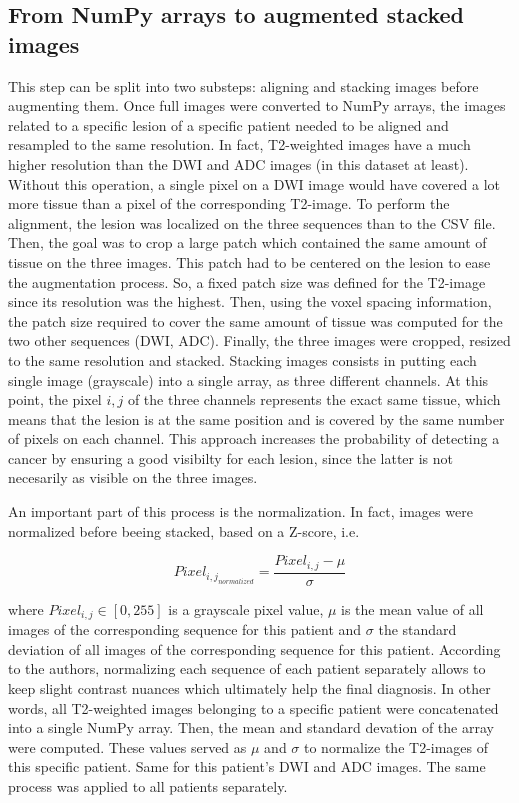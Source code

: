 \subsection{From NumPy arrays to augmented stacked images}
\label{sec:numpyToAugmentedStacked}
This step can be split into two substeps: aligning and stacking images before augmenting them. Once full images were converted to NumPy arrays, the images related to a specific lesion of a specific patient needed to be aligned and resampled to the same resolution. In fact, T2-weighted images have a much higher resolution than the DWI and ADC images (in this dataset at least). Without this operation, a single pixel on a DWI image would have covered a lot more tissue than a pixel of the corresponding T2-image. To perform the alignment, the lesion was localized on the three sequences than to the CSV file. Then, the goal was to crop a large patch which contained the same amount of tissue on the three images. This patch had to be centered on the lesion to ease the augmentation process. So, a fixed patch size was defined for the T2-image since its resolution was the highest. Then, using the voxel spacing information, the patch size required to cover the same amount of tissue was computed for the two other sequences (DWI, ADC). Finally, the three images were cropped, resized to the same resolution and stacked. Stacking images consists in putting each single image (grayscale) into a single array, as three different channels. At this point, the pixel $i,j$ of the three channels represents the exact same tissue, which means that the lesion is at the same position and is covered by the same number of pixels on each channel. This approach increases the probability of detecting a cancer by ensuring a good visibilty for each lesion, since the latter is not necesarily as visible on the three images.

An important part of this process is the normalization. In fact, images were normalized before beeing stacked, based on a Z-score, i.e. 

\begin{equation}
\label{eq:normalization}
	Pixel_{{i,j}_{normalized}} = \frac{Pixel_{i,j} - \mu}{\sigma}
\end{equation}

\noindent where $Pixel_{i,j} \in [0,255]$ is a grayscale pixel value, $\mu$ is the mean value of all images of the corresponding sequence for this patient and $\sigma$ the standard deviation of all images of the corresponding sequence for this patient. According to the authors, normalizing each sequence of each patient separately allows to keep slight contrast nuances which ultimately help the final diagnosis. In other words, all T2-weighted images belonging to a specific patient were concatenated into a single NumPy array. Then, the mean and standard devation of the array were computed. These values served as $\mu$ and $\sigma$ to normalize the T2-images of this specific patient. Same for this patient's DWI and ADC images. The same process was applied to all patients separately. 

